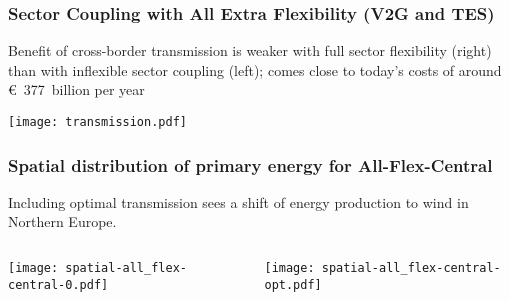 \documentclass[10pt,aspectratio=169,dvipsnames]{beamer}
\begin{document}
\begin{frame}
  \frametitle{Sector Coupling with All Extra Flexibility (V2G and TES)}

  Benefit of cross-border transmission is weaker with full sector flexibility (right) than with inflexible sector coupling (left); comes close to today's costs of around \euro~377~billion per year

  \centering
  \texttt{[image: transmission.pdf]}
\end{frame}



\begin{frame}
  \frametitle{Spatial distribution of primary energy for All-Flex-Central}

  Including optimal transmission sees a shift of energy production to wind in Northern Europe.

\begin{columns}[T]
  \begin{column}{7cm}

    \vspace{0.5cm}
  \texttt{[image: spatial-all\_flex-central-0.pdf]}

  \end{column}
  \begin{column}{7cm}

    \vspace{0.5cm}
  \texttt{[image: spatial-all\_flex-central-opt.pdf]}

  \end{column}
\end{columns}
\end{frame}
\end{document}
